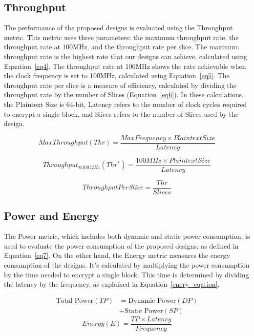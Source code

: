 \documentclass[final,5p,times,twocolumn]{elsarticle}
\begin{document}
\subsection{Throughput}\label{subsec6}
The performance of the proposed designs is evaluated using the Throughput metric. This metric uses three parameters: the maximum throughput rate, the throughput rate at 100MHz, and the throughput rate per slice.
The maximum throughput rate is the highest rate that our designs can achieve, calculated using Equation~\ref{eq4}.
The throughput rate at 100MHz shows the rate achievable when the clock frequency is set to 100MHz, calculated using Equation~\ref{eq5}.
The throughput rate per slice is a measure of efficiency, calculated by dividing the throughput rate by the number of Slices (Equation~\ref{eq6}).
In these calculations, the Plaintext Size is 64-bit, Latency refers to the number of clock cycles required to encrypt a single block, and Slices refers to the number of Slices used by the design.

\begin{equation}
    MaxThroughput(Thr) = \frac{MaxFrequency \times Plaintext Size}{Latency}
    \label{eq4}
\end{equation}

\begin{equation}
    Throughput_{@100MHz}(Thr^*) = \frac{100MHz \times Plaintext Size}{Latency}
    \label{eq5}
\end{equation}

\begin{equation}
    ThroughputPerSlice = \frac{Thr}{Slices}
    \label{eq6}
\end{equation}

\subsection{Power and Energy}\label{power_energy}

The Power metric, which includes both dynamic and static power consumption, is used to evaluate the power consumption of the proposed designs, as defined in Equation~\ref{eq7}.
On the other hand, the Energy metric measures the energy consumption of the designs. It's calculated by multiplying the power consumption by the time needed to encrypt a single block. This time is determined by dividing the latency by the frequency, as explained in Equation~\ref{enery_eqation}.

\begin{align}
    \text{Total Power} (TP) & = \text{Dynamic Power} (DP) \nonumber \\
                            & + \text{Static Power} (SP)
    \label{eq7}
\end{align}
\begin{equation}
    Energy(E) = \frac{TP \times Latency }{Frequency}
    \label{enery_eqation}
\end{equation}
\end{document}
